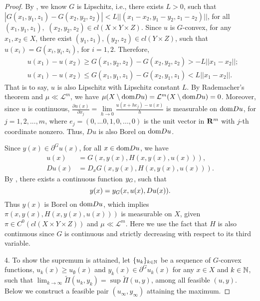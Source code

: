 \begin{proof}
	By \Gzero, we know $G$ is Lipschitz, i.e., there exists $L>0$, such that $|G(x_1, y_1, z_1)-G(x_2, y_2, z_2)|< L ||(x_1-x_2,y_1-y_2, z_1-z_2)||$, for all $(x_1,y_1,z_1),$ $(x_2, y_2, z_2) \in cl(X\times Y\times Z)$.
	Since $u$ is $G$-convex, for any $x_1, x_2 \in X$, there exist $(y_1, z_1), (y_2, z_2) \in cl( Y \times Z)$, such that $u(x_i) = G(x_i,y_i,z_i)$, for $i=1,2$. Therefore, 
	\begin{equation*}
	\begin{split}
	&u(x_1)-u(x_2) \ge G(x_1, y_2, z_2) - G(x_2, y_2, z_2) > -L ||x_1-x_2||;\\
	& 	u(x_1)-u(x_2) \le G(x_1, y_1, z_1) - G(x_2, y_1, z_1) < L ||x_1-x_2||.
	\end{split}
	\end{equation*}
	That is to say, $u$ is also Lipschitz with Lipschitz constant $L$. By Rademacher's theorem and $\mu \ll \mathcal{L}^m$, we have $\mu(X\setminus {\mathop{\rm dom}} Du) =\mathcal{L}^m(X\setminus {\mathop{\rm dom}} Du) =0$.  Moreover, since $u$ is continuous, $\frac{\partial u(x)}{\partial x_j} = \lim\limits_{h\rightarrow 0} \frac{u(x+he_j)-u(x)}{h}$ is measurable on ${\mathop{\rm dom}} Du$, for $j=1,2,..., m$, where $e_j=(0,...0, 1, 0, ...,0)$ is the unit vector in ${\mathbf R}^m$ with $j$-th coordinate nonzero. Thus, $Du$ is also Borel on ${\mathop{\rm dom}} Du$.
	
	Since $y(x) \in \partial^G u(x) $, for all $x\in {\mathop{\rm dom}} Du$, we have
	\begin{equation}\label{EqnInverse2}
	\begin{split}
		u(x) &= G(x, y(x), H(x, y(x), u(x))), \\
		Du(x) &= D_xG(x, y(x), H(x, y(x), u(x))).
	\end{split}
	\end{equation}
	By \Gone, there exists a continuous function $y_G$, such that 
	\begin{equation*}
		y(x) = y_G(x, u(x), Du(x)).
	\end{equation*} 
	Thus $y(x)$ is Borel on ${\mathop{\rm dom}} Du$, which implies $\pi(x, y(x), H(x,y(x), u(x)))$ is measurable on $X$, given $\pi \in C^0(cl(X\times Y\times Z))$ and $\mu \ll \mathcal{L}^m$. Here we use the fact that $H$ is also continuous since $G$ is continuous and strictly decreasing with respect	to its third variable.\medskip
											
											
	4. To show the supremum is attained,
	let $\{u_k\}_{k\in \mathbb{N}}$ be a sequence of %
	$G$-convex functions, $u_k(x) \ge u_{\emptyset}(x)$ and  $y_k(x) \in \partial^G u_k(x)$ for any $x\in X$ and $k \in \mathbb{N}$,  such that $\lim_{k\rightarrow \infty} \tilde{\Pi}(u_k, y_k) = \sup \tilde{\Pi}(u,y)$, among all feasible $(u,y)$. Below we construct a feasible pair $(u_{\infty}, y_{\infty})$ 
	attaining the maximum.
											

\end{proof}
